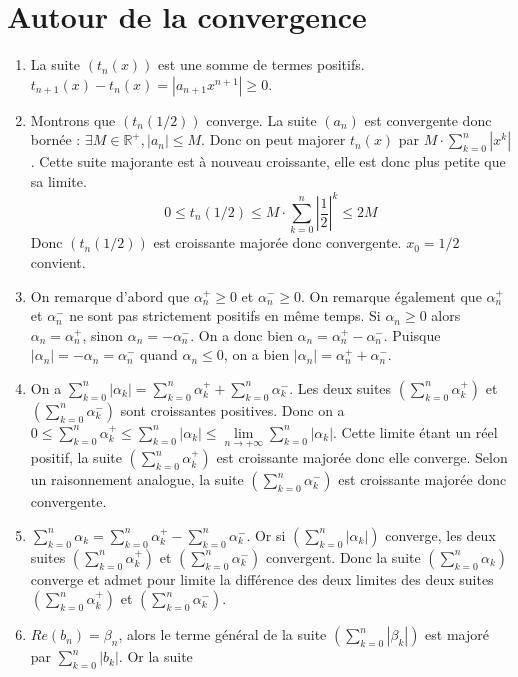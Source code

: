 \documentclass[10pt,a4paper]{article}
\begin{document}
\section{Autour de la convergence}
\begin{enumerate}
\item La suite $(t_n(x))$ est une somme de termes positifs. $t_{n+1}(x)-t_n(x)=|a_{n+1}x^{n+1}| \geqslant 0$.
\item Montrons que $(t_n(1/2))$ converge. La suite $(a_n)$ est convergente donc bornée : $\exists M \in \mathbb{R}^+, | a_n | \leqslant M$. Donc on 
peut majorer $t_n(x)$ par $M\cdotp\sum\limits_{k=0}^n| x^k |$. Cette suite majorante est à nouveau croissante, elle est donc plus petite que sa limite.
$$0\leqslant t_n(1/2)\leqslant M\cdotp\sum\limits_{k=0}^n| \frac{1}{2} | ^k \leqslant 2M$$
Donc $(t_n(1/2))$ est croissante majorée donc convergente. $x_0=1/2$ convient.
\item On remarque d'abord que $\alpha_n^+\geqslant 0$ et $\alpha_n^-\geqslant 0$. On remarque également que $\alpha_n^+$ et $\alpha_n^-$ ne sont pas
strictement positifs en même temps. Si $\alpha_n\geqslant 0$ alors $\alpha_n=\alpha_n^+$, sinon $\alpha_n=-\alpha_n^-$. On a donc bien
 $\alpha_n=\alpha_n^+-\alpha_n^-$. Puisque $| \alpha_n | = -\alpha_n=\alpha_n^-$ quand $\alpha_n \leqslant 0$,
on a bien $| \alpha_n | = \alpha_n^+ +\alpha_n^-$.
\item On a $\sum\limits_{k=0}^n| \alpha_k|=\sum\limits_{k=0}^n\alpha_k^+ +\sum\limits_{k=0}^n\alpha_k^-$. Les deux suites $(\sum\limits_{k=0}^n\alpha_k^+)$ et
 $(\sum\limits_{k=0}^n\alpha_k^-)$ sont croissantes positives. Donc on a $0\leqslant \sum\limits_{k=0}^n\alpha_k^+ \leqslant \sum\limits_{k=0}^n| \alpha_k |
 \leqslant \lim\limits_{n\to+\infty}\sum\limits_{k=0}^n | \alpha_k|$. Cette limite étant un réel positif, la suite $(\sum\limits_{k=0}^n\alpha_k^+)$
 est croissante majorée donc elle converge. Selon un raisonnement analogue, la suite $(\sum\limits_{k=0}^n\alpha_k^-)$ est croissante majorée donc convergente.
\item $\sum\limits_{k=0}^n\alpha_k=\sum\limits_{k=0}^n\alpha_k^+-\sum\limits_{k=0}^n\alpha_k^-$. Or si $(\sum\limits_{k=0}^n| \alpha_k|)$ converge, les deux suites 
$(\sum\limits_{k=0}^n\alpha_k^+)$ et $(\sum\limits_{k=0}^n\alpha_k^-)$ convergent. Donc la suite $(\sum\limits_{k=0}^n\alpha_k)$ converge et admet pour limite
 la différence des deux limites des deux suites $(\sum\limits_{k=0}^n\alpha_k^+)$ et $(\sum\limits_{k=0}^n\alpha_k^-)$.
\item $Re(b_n)=\beta_n$, alors le terme général de la suite $(\sum\limits_{k=0}^n|\beta_k|)$ est majoré par $\sum\limits_{k=0}^n|b_k|$. Or la suite 

\end{enumerate}
\end{document}
